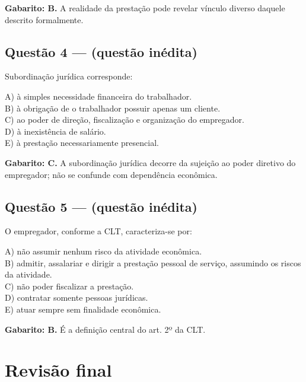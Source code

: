 \documentclass[11pt,a4paper]{article}
\begin{document}
\begin{alerta}
\textbf{Gabarito: B.} A realidade da prestação pode revelar vínculo diverso daquele descrito formalmente.
\end{alerta}

\subsection*{Questão 4 — (questão inédita)}

Subordinação jurídica corresponde:

A) à simples necessidade financeira do trabalhador. \\ B) à obrigação de o trabalhador possuir apenas um cliente. \\ C) ao poder de direção, fiscalização e organização do empregador. \\ D) à inexistência de salário. \\ E) à prestação necessariamente presencial.

\begin{alerta}
\textbf{Gabarito: C.} A subordinação jurídica decorre da sujeição ao poder diretivo do empregador; não se confunde com dependência econômica.
\end{alerta}

\subsection*{Questão 5 — (questão inédita)}

O empregador, conforme a CLT, caracteriza-se por:

A) não assumir nenhum risco da atividade econômica. \\ B) admitir, assalariar e dirigir a prestação pessoal de serviço, assumindo os riscos da atividade. \\ C) não poder fiscalizar a prestação. \\ D) contratar somente pessoas jurídicas. \\ E) atuar sempre sem finalidade econômica.

\begin{alerta}
\textbf{Gabarito: B.} É a definição central do art. 2º da CLT.
\end{alerta}

\section*{Revisão final}
\end{document}
